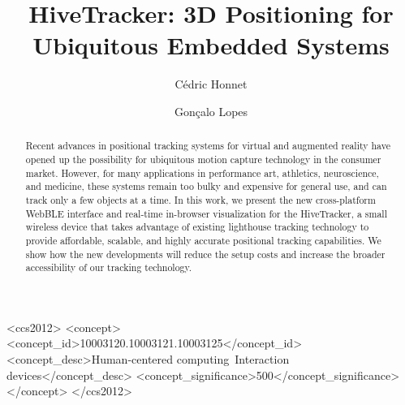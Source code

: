 \documentclass[sigchi-a]{acmart}
\begin{document}
\title{HiveTracker: 3D Positioning for Ubiquitous Embedded Systems}

\author{C\'edric Honnet}

\author{Gon\c{c}alo Lopes}



\begin{abstract}
  Recent advances in positional tracking systems for virtual and augmented reality have opened up the possibility for ubiquitous motion capture technology in the consumer market. However, for many applications in performance art, athletics, neuroscience, and medicine, these systems remain too bulky and expensive for general use, and can track only a few objects at a time. In this work, we present the new cross-platform WebBLE interface and real-time in-browser visualization for the HiveTracker, a small wireless device that takes advantage of existing lighthouse tracking technology to provide affordable, scalable, and highly accurate positional tracking capabilities. We show how the new developments will reduce the setup costs and increase the broader accessibility of our tracking technology.
\end{abstract}


\begin{CCSXML}
<ccs2012>
<concept>
<concept_id>10003120.10003121.10003125</concept_id>
<concept_desc>Human-centered computing~Interaction devices</concept_desc>
<concept_significance>500</concept_significance>
</concept>
</ccs2012>
\end{CCSXML}
\end{document}
